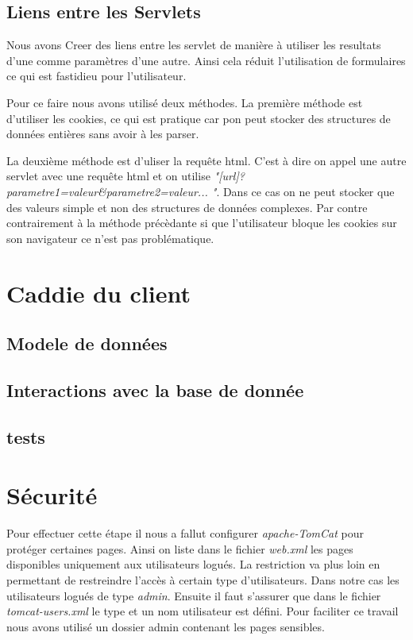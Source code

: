 \documentclass[12pt]{article}
\begin{document}
\subsection{Liens entre les Servlets}

Nous avons Creer des liens entre les servlet de manière à utiliser les resultats d'une comme paramètres d'une autre. Ainsi cela réduit l'utilisation de formulaires ce qui est fastidieu pour l'utilisateur.

Pour ce faire nous avons utilisé deux méthodes. La première méthode est d'utiliser les cookies, ce qui est pratique car pon peut stocker des structures de données entières sans avoir à les parser.

La deuxième méthode est d'uliser la requête html. C'est à dire on appel une autre servlet avec une requête html et on utilise \emph{"[url]?parametre1=valeur\&parametre2=valeur... "}. Dans ce cas on ne peut stocker que des valeurs simple et non des structures de données complexes. Par contre contrairement à la méthode précèdante si que l'utilisateur bloque les cookies sur son navigateur ce n'est pas problématique.


\section{Caddie du client}
 
\subsection{Modele de données}
 
\subsection{Interactions avec la base de donnée}

\subsection{tests}

\section{Sécurité}

Pour effectuer cette étape il nous a fallut configurer \emph{apache-TomCat} pour protéger certaines pages. Ainsi on liste dans le fichier \emph{web.xml} les pages disponibles uniquement aux utilisateurs logués. La restriction va plus loin en permettant de restreindre l'accès à certain type d'utilisateurs. Dans notre cas les utilisateurs logués de type \emph{admin}. Ensuite il faut s'assurer que dans le fichier \emph{tomcat-users.xml} le type et un nom utilisateur est défini. Pour faciliter ce travail nous avons utilisé un dossier admin contenant les pages sensibles.
\end{document}
